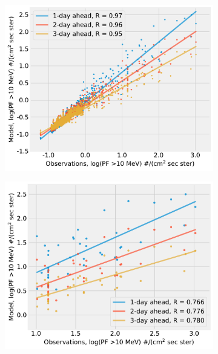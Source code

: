 \begin{figure}[htp]
    \centering
    \begin{subfigure}{0.4\textwidth}
         \centering
         \includegraphics[width=\textwidth]{chapter4/figs/scatterplot_obs_vs_model_tstset_3in1_log_PF10.pdf}
    \end{subfigure}
    \begin{subfigure}{0.4\textwidth}
         \centering
         \includegraphics[width=\textwidth]{chapter4/figs/scatterplot_obs_vs_model_tstset_3in1_LOG_PF_LT1_log_PF10.pdf}
    \end{subfigure}

\end{figure}
